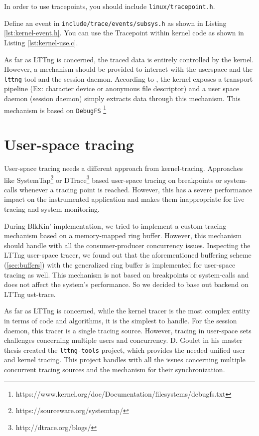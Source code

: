 In order to use tracepoints, you should include \texttt{linux/tracepoint.h}.

Define an event in \texttt{include/trace/events/subsys.h} as shown in Listing
\ref{lst:kernel-event.h}. You can use the Tracepoint within kernel code as shown
in Listing \ref{lst:kernel-use.c}.


As far as LTTng is concerned, the traced data is entirely controlled by the
kernel. However, a mechanism should be provided to interact with the userspace
and the \texttt{lttng} tool and the session daemon. According to
\cite{desnoyer}, the kernel exposes a transport pipeline (Ex: character device
or anonymous file descriptor) and a user space daemon (session daemon) simply
extracts data through this mechanism. This mechanism is based on
\texttt{DebugFS}
\footnote{https://www.kernel.org/doc/Documentation/filesystems/debugfs.txt}

\section{User-space tracing}\label{sec:user-tracing}

User-space tracing needs a different approach from kernel-tracing. Approaches
like SystemTap\footnote{https://sourceware.org/systemtap/} or
DTrace\footnote{http://dtrace.org/blogs/} based user-space tracing on
breakpoints or system-calls whenever a tracing point is reached. However, this
has a severe performance impact on the instrumented application and makes them
inappropriate for live tracing and system monitoring. 

During BlkKin' implementation, we tried to implement a custom tracing mechanism
based on a memory-mapped ring buffer. However, this mechanism should handle
with all the consumer-producer concurrency issues. Inspecting the LTTng
user-space tracer, we found out that the aforementioned buffering scheme
(\ref{sec:buffers}) with the generalized ring buffer is implemented for
user-space tracing as well. This mechanism is not based on breakpoints or
system-calls and does not affect the system's performance. So we decided to
base out backend on LTTng ust-trace. 

As far as LTTng is concerned, while the kernel tracer is the most complex entity
in terms of code and algorithms, it is the simplest to handle. For the session
daemon, this tracer is a single tracing source. However, tracing in user-space
sets challenges concerning multiple users and concurrency. D. Goulet in his
master thesis \cite{goulet} created the \texttt{lttng-tools} project, which
provides the needed unified user and kernel tracing. This project handles with
all the issues concerning multiple concurrent tracing sources and the mechanism
for their synchronization.

